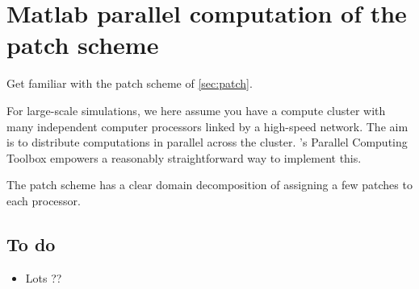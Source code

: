 \chapter{Matlab parallel computation of the patch scheme}
\label{sec:parallel}
\localtableofcontents


Get familiar with the patch scheme of \cref{sec:patch}.

For large-scale simulations, we here assume you have a compute cluster with many independent computer processors linked by a high-speed network.
The aim is to distribute computations in parallel across the cluster.
\Matlab's Parallel Computing Toolbox empowers a reasonably straightforward way to implement this.

The patch scheme has a clear domain decomposition of assigning a few patches to each processor.  





\begin{devMan}

\section{To do}
\begin{itemize}
\item Lots ??
\end{itemize}

\end{devMan}

